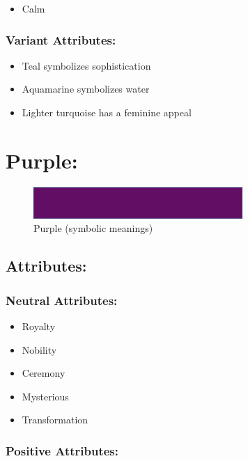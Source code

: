 \documentclass[openleft,oneside,showtrims]{memoir}
\begin{document}
\begin{itemize}
\item Calm
\end{itemize}

\subsubsection*{Variant Attributes:}
\label{sec:org007c868}

\begin{itemize}
\item Teal symbolizes sophistication
\item Aquamarine symbolizes water
\item Lighter turquoise has a feminine appeal
\end{itemize}

\section{Purple:}
\label{sec:orgff7b13d}

\begin{figure}[htbp]
\centering
\includegraphics[width=300px]{./media/purple-banner.png}
\caption{\label{fig:HAP-WR-008}Purple (symbolic meanings)}
\end{figure}

\subsection{Attributes:}
\label{sec:org2611a68}

\subsubsection*{Neutral Attributes:}
\label{sec:orgb8f6187}

\begin{itemize}
\item Royalty
\item Nobility
\item Ceremony
\item Mysterious
\item Transformation
\end{itemize}

\subsubsection*{Positive Attributes:}
\label{sec:org07b69f8}
\end{document}
